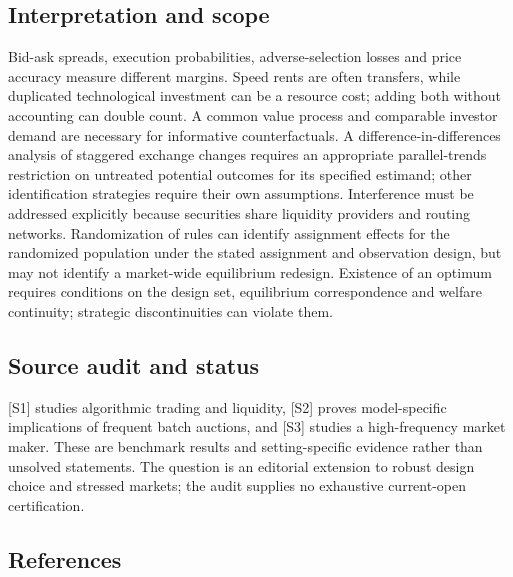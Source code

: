 \documentclass[11pt,a4paper]{article}
\begin{document}
\subsection*{Interpretation and scope}
Bid-ask spreads, execution probabilities, adverse-selection losses and price accuracy measure different margins. Speed rents are often transfers, while duplicated technological investment can be a resource cost; adding both without accounting can double count. A common value process and comparable investor demand are necessary for informative counterfactuals. A difference-in-differences analysis of staggered exchange changes requires an appropriate parallel-trends restriction on untreated potential outcomes for its specified estimand; other identification strategies require their own assumptions. Interference must be addressed explicitly because securities share liquidity providers and routing networks. Randomization of rules can identify assignment effects for the randomized population under the stated assignment and observation design, but may not identify a market-wide equilibrium redesign. Existence of an optimum requires conditions on the design set, equilibrium correspondence and welfare continuity; strategic discontinuities can violate them.

\subsection*{Source audit and status}
[S1] studies algorithmic trading and liquidity, [S2] proves model-specific implications of frequent batch auctions, and [S3] studies a high-frequency market maker. These are benchmark results and setting-specific evidence rather than unsolved statements. The question is an editorial extension to robust design choice and stressed markets; the audit supplies no exhaustive current-open certification.

\subsection*{References}
\end{document}
